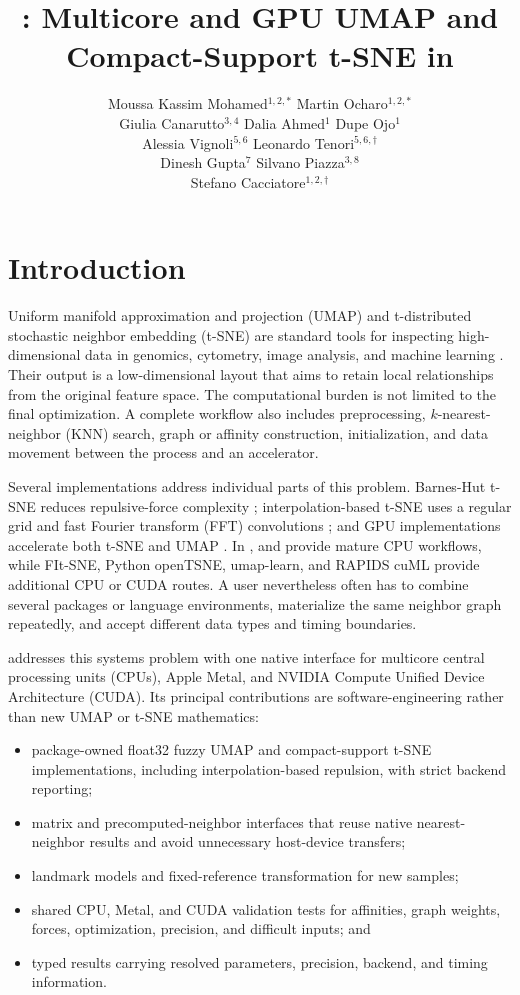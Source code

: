 \documentclass[article]{jss}
\author{Moussa Kassim Mohamed$^{1,2,*}$ \quad Martin Ocharo$^{1,2,*}$\\
  Giulia Canarutto$^{3,4}$ \quad Dalia Ahmed$^1$ \quad Dupe Ojo$^1$\\
  Alessia Vignoli$^{5,6}$ \quad Leonardo Tenori$^{5,6,\dagger}$\\
  Dinesh Gupta$^{7}$ \quad Silvano Piazza$^{3,8}$\\
  Stefano Cacciatore$^{1,2,\dagger}$}
\title{\fastEmbedR: Multicore and GPU UMAP and
  Compact-Support t-SNE in \proglang{R}}
\newcommand{\fastEmbedR}{\pkg{fastEmbedR}\xspace}
\begin{document}
\section{Introduction}

Uniform manifold approximation and projection (UMAP) and t-distributed
stochastic neighbor embedding (t-SNE) are standard tools for inspecting
high-dimensional data in genomics, cytometry, image analysis, and machine
learning \citep{vandermaaten2008,mcinnes2018,kobak2019}. Their output is a
low-dimensional layout that aims to retain local relationships from the
original feature space. The computational burden is not limited to the final
optimization. A complete workflow also includes preprocessing,
$k$-nearest-neighbor (KNN)
search, graph or affinity construction, initialization, and data movement
between the  process and an accelerator.

Several implementations address individual parts of this problem.
Barnes-Hut t-SNE reduces repulsive-force complexity
\citep{vandermaaten2014}; interpolation-based t-SNE uses a regular grid and
fast Fourier transform (FFT) convolutions \citep{linderman2019}; and GPU
implementations accelerate both t-SNE and UMAP
\citep{chan2018,nolet2020}. In ,  and 
provide mature CPU workflows, while FIt-SNE, Python openTSNE, umap-learn, and
RAPIDS cuML provide additional CPU or CUDA routes. A user nevertheless often
has to combine several packages or language environments, materialize the
same neighbor graph repeatedly, and accept different data types and timing
boundaries.

\fastEmbedR addresses this systems problem with one native 
interface for multicore central processing units (CPUs), Apple Metal, and
NVIDIA Compute Unified Device Architecture (CUDA). Its principal contributions
are software-engineering rather than new UMAP or t-SNE mathematics:
\begin{itemize}
  \item package-owned float32 fuzzy UMAP and compact-support t-SNE
    implementations, including interpolation-based repulsion, with strict
    backend reporting;
  \item matrix and precomputed-neighbor interfaces that reuse native
    nearest-neighbor results and avoid unnecessary host-device transfers;
  \item landmark models and fixed-reference transformation for new samples;
  \item shared CPU, Metal, and CUDA validation tests for affinities, graph
    weights, forces, optimization, precision, and difficult inputs; and
  \item typed results carrying resolved parameters, precision, backend, and
    timing information.
\end{itemize}
\end{document}
